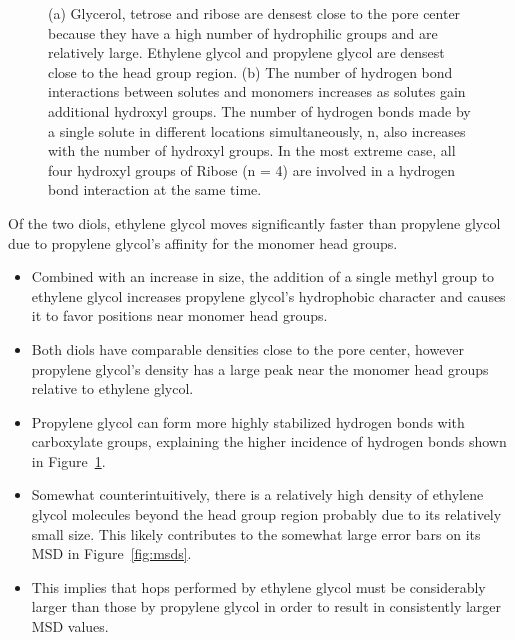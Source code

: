 \documentclass{article}
\begin{document}
\begin{figure}[!htb]
  \caption{(a) Glycerol, tetrose and ribose are densest close to the pore center because
  they have a high number of hydrophilic groups and are relatively large. Ethylene glycol
  and propylene glycol are densest close to the head group region. (b) The number of 
  hydrogen bond interactions between solutes and monomers increases as solutes gain additional
  hydroxyl groups. The number of hydrogen bonds made by a single solute in different locations
  simultaneously, n, also increases with the number of hydroxyl groups. In the most extreme case,
  all four hydroxyl groups of Ribose (n = 4) are involved in a hydrogen bond interaction at
  the same time.}\label{fig:multi_hbonds}
  \end{figure}
  
  Of the two diols, ethylene glycol moves significantly faster than propylene glycol
  due to propylene glycol's affinity for the monomer head groups.  
  \begin{itemize}
    \item Combined with an increase in size, the addition of a single methyl group to ethylene glycol
    increases propylene glycol's hydrophobic character and causes it to favor positions
    near monomer head groups.
    \item Both diols have comparable densities close to the pore center, however propylene glycol's
    density has a large peak near the monomer head groups relative to ethylene glycol.
    \item Propylene glycol can form more highly stabilized hydrogen bonds with carboxylate groups,
    explaining the higher incidence of hydrogen bonds shown in Figure~\ref{fig:multi_hbonds}.
    \item Somewhat counterintuitively, there is a relatively high density of ethylene
    glycol molecules beyond the head group region probably due to its relatively small size.
    This likely contributes to the somewhat large error bars on its MSD in Figure~\ref{fig:msds}. 
    \item This implies that hops performed by ethylene glycol must be considerably larger
    than those by propylene glycol in order to result in consistently larger MSD values.
  \end{itemize}
  
\end{document}
